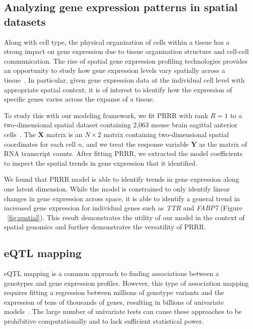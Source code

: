 \documentclass{bmcart}
\begin{document}
\subsection*{Analyzing gene expression patterns in spatial datasets}
Along with cell type, the physical organization of cells within a tissue has a strong impact on gene expression due to tissue organization structure and cell-cell communication. The rise of spatial gene expression profiling technologies provides an opportunity to study how gene expression levels vary spatially across a tissue~\citep{stickels2021highly,staahl2016visualization,rodriques2019slide,lee2021xyzeq}. In particular, given gene expression data at the individual cell level with appropriate spatial context, it is of interest to identify how the expression of specific genes varies across the expanse of a tissue. 

To study this with our modeling framework, we fit PRRR with rank $R=1$ to a two-dimensional spatial dataset containing 2,063 mouse brain sagittal anterior cells~\citep{10xVisium}. The $\mathbf{X}$ matrix is an $N \times 2$ matrix containing two-dimensional spatial coordinates for each cell $n$, and we treat the response variable $\mathbf{Y}$ as the matrix of RNA transcript counts. After fitting PRRR, we extracted the model coefficients to inspect the spatial trends in gene expression that it identified.

We found that PRRR model is able to identify trends in gene expression along one latent dimension. While the model is constrained to only identify linear changes in gene expression across space, it is able to identify a general trend in increased gene expression for individual genes such as \emph{TTR} and \emph{FABP7} (Figure ~\ref{fig:spatial}). This result demonstrates the utility of our model in the context of spatial genomics and further demonstrates the versatility of PRRR.

\subsection*{eQTL mapping}
eQTL mapping is a common approach to finding associations between a genotypes and gene expression profiles. However, this type of association mapping requires fitting a regression between millions of genotype variants and the expression of tens of thousands of genes, resulting in billions of univariate models~\citep{aguet2017genetic}. The large number of univariate tests can cause these approaches to be prohibitive computationally and to lack sufficient statistical power. 
\end{document}
